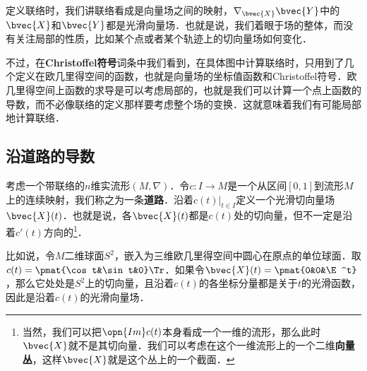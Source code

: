 

定义联络时，我们讲联络看成是向量场之间的映射，$\nabla_\bvec{X}\bvec{Y}$中的$\bvec{X}$和$\bvec{Y}$都是光滑向量场．也就是说，我们着眼于场的整体，而没有关注局部的性质，比如某个点或者某个轨迹上的切向量场如何变化．

不过，在\textbf{Christoffel符号}词条中我们看到，在具体图中计算联络时，只用到了几个定义在欧几里得空间的函数，也就是向量场的坐标值函数和Christoffel符号．欧几里得空间上函数的求导是可以考虑局部的，也就是我们可以计算一个点上函数的导数，而不必像联络的定义那样要考虑整个场的变换．这就意味着我们有可能局部地计算联络．

\subsection{沿道路的导数}

考虑一个带联络的$n$维实流形$(M, \nabla)$．令$c:I\to M$是一个从区间$[0, 1]$到流形$M$上的连续映射，我们称之为一条\textbf{道路}．沿着$c(t)|_{t\in I}$定义一个光滑切向量场$\bvec{X}(t)$．也就是说，各$\bvec{X}(t)$都是$c(t)$处的切向量，但不一定是沿着$c'(t)$方向的\footnote{当然，我们可以把$\opn{Im}c(t)$本身看成一个一维的流形，那么此时$\bvec{X}$就不是其切向量．我们可以考虑在这个一维流形上的一个二维\textbf{向量丛}，这样$\bvec{X}$就是这个丛上的一个截面．}．

比如说，令$M$二维球面$S^2$，嵌入为三维欧几里得空间中圆心在原点的单位球面．取$c(t)=\pmat{\cos t&\sin t&0}\Tr$．如果令$\bvec{X}(t)=\pmat{0&0&\E^t}$，那么它处处是$S^2$上的切向量，且沿着$c(t)$的各坐标分量都是关于$t$的光滑函数，因此是沿着$c(t)$的光滑向量场．




